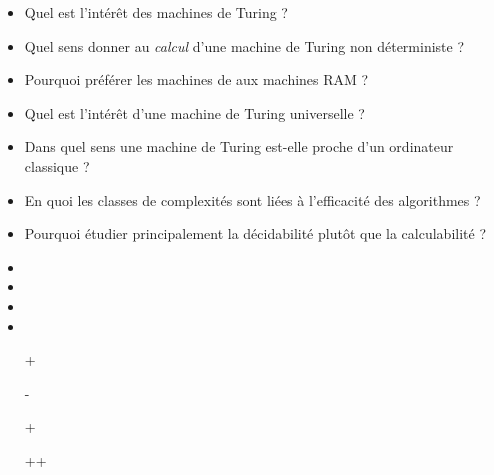 \documentclass{agregfiche}
\begin{document}
\secquestionsclassiques

\begin{itemize}
    \item Quel est l'intérêt des machines de Turing ?
    \item Quel sens donner au \emph{calcul} d'une machine de Turing non
        déterministe ?
    \item Pourquoi préférer les machines de  aux machines RAM ?
    \item Quel est l'intérêt d'une machine de Turing universelle ?
    \item Dans quel sens une machine de Turing est-elle proche d'un ordinateur
        classique ?
    \item En quoi les classes de complexités sont liées à l'efficacité des
        algorithmes ?
    \item Pourquoi étudier principalement la décidabilité plutôt que la
        calculabilité ?
\end{itemize}

\secreferences

\begin{itemize}
    \item 
    \item 
    \item 
    \item 
\end{itemize}


\secdev

\begin{itemize}
    \item[+] 
    \item[-] 
    \item[+] 
    \item[++] 
    
\end{itemize}
\end{document}
